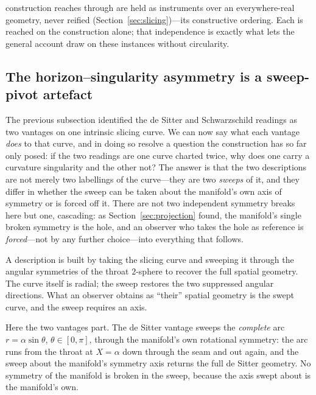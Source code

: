\documentclass[11pt,a4paper]{article}
\theoremstyle{definition}
\begin{document}
construction reaches through are held as instruments over an everywhere-real geometry, never reified (Section~\ref{sec:slicing})---its constructive ordering. Each is reached on the construction alone; that independence is exactly what lets the general account draw on these instances without circularity.

\subsection{The horizon--singularity asymmetry is a sweep-pivot artefact}\label{sec:sweep}

The previous subsection identified the de Sitter and Schwarzschild readings as two vantages on one intrinsic slicing curve. We can now say what each vantage \emph{does} to that curve, and in doing so resolve a question the construction has so far only posed: if the two readings are one curve charted twice, why does one carry a curvature singularity and the other not? The answer is that the two descriptions are not merely two labellings of the curve---they are two \emph{sweeps} of it, and they differ in whether the sweep can be taken about the manifold's own axis of symmetry or is forced off it. There are not two independent symmetry breaks here but one, cascading: as Section~\ref{sec:projection} found, the manifold's single broken symmetry is the hole, and an observer who takes the hole as reference is \emph{forced}---not by any further choice---into everything that follows.

A description is built by taking the slicing curve and sweeping it through the angular symmetries of the throat $2$-sphere to recover the full spatial geometry. The curve itself is radial; the sweep restores the two suppressed angular directions. What an observer obtains as ``their'' spatial geometry is the swept curve, and the sweep requires an axis.

Here the two vantages part. The de Sitter vantage sweeps the \emph{complete} arc $r=\alpha\sin\theta$, $\theta\in[0,\pi]$, through the manifold's own rotational symmetry: the arc runs from the throat at $X=\alpha$ down through the seam and out again, and the sweep about the manifold's symmetry axis returns the full de Sitter geometry. No symmetry of the manifold is broken in the sweep, because the axis swept about is the manifold's own.
\end{document}
